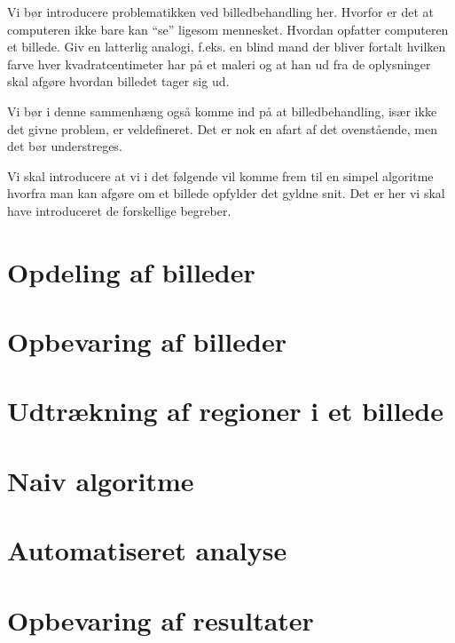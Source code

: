 {
{\sffamily Vi bør introducere problematikken ved billedbehandling her.
Hvorfor er det at computeren ikke bare kan ``se'' ligesom mennesket.
Hvordan opfatter computeren et billede. Giv en latterlig analogi, f.eks.
en blind mand der bliver fortalt hvilken farve hver kvadratcentimeter
har på et maleri og at han ud fra de oplysninger skal afgøre hvordan
billedet tager sig ud.

Vi bør i denne sammenhæng også komme ind på at billedbehandling, især
ikke det givne problem, er veldefineret. Det er nok en afart af det
ovenstående, men det bør understreges.

Vi skal introducere at vi i det følgende vil komme frem til en simpel
algoritme hvorfra man kan afgøre om et billede opfylder det gyldne snit.
Det er her vi skal have introduceret de forskellige begreber.
}

\section{Opdeling af billeder}


\section{Opbevaring af billeder\label{section_opbv_billeder}}


\section{Udtrækning af regioner i et billede}


\section{Naiv algoritme\label{naiv_algoritme}}


\section{Automatiseret analyse}


\section{Opbevaring af resultater\label{section_results}}


}

